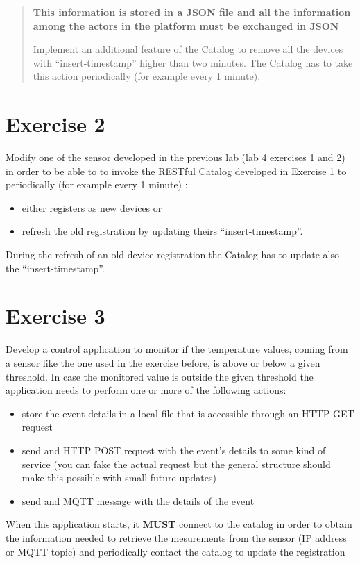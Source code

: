 \documentclass[a4paper]{article}
\begin{document}
\begin{quote}
\textbf{This information is stored in a JSON file and all the information
among the actors in the platform must be exchanged in JSON}

Implement an additional feature of the Catalog to remove all the
devices with “insert-timestamp” higher than two minutes. The Catalog
has to take this action periodically (for example every 1 minute).
\end{quote}

\section{Exercise 2}
\label{sec:org4103cd5}
Modify one of the sensor developed in the previous lab (lab 4 exercises 1 and 2)
in order to be able to to invoke the RESTful Catalog developed
in Exercise 1 to periodically (for example every 1 minute) :
\begin{itemize}
\item either registers as new devices or
\item refresh the old registration by updating theirs “insert-timestamp”.
\end{itemize}

During the refresh of an old device registration,the Catalog has to update also
the “insert-timestamp”.

\section{Exercise 3}
\label{sec:org1ab8ae8}
Develop a control application to monitor if the temperature values, coming from
a sensor like the one used in the exercise before, is above or below a given
threshold. In case the monitored value is outside the given threshold the
application needs to perform one or more of the following actions:
\begin{itemize}
\item store the event details in a local file that is accessible through an HTTP GET
request
\item send and HTTP POST request with the event's details to some kind of service (you can fake the actual
request but the general structure should make this possible with small future
updates)
\item send and MQTT message with the details of the event
\end{itemize}

When this application starts, it \textbf{\textbf{MUST}} connect to the catalog in order to
obtain the information needed to retrieve the mesurements from the sensor (IP
address or MQTT topic) and periodically contact the catalog to update the registration
\end{document}
